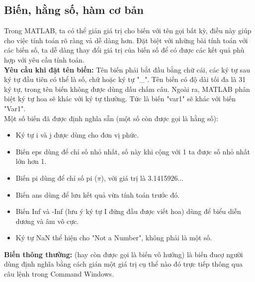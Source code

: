 \documentclass[12pt,a4paper]{article}
\begin{document}
\subsection{Biến, hằng số, hàm cơ bản}
Trong MATLAB, ta có thể gián giá trị cho biến với tên gọi bất kỳ, điều này giúp cho việc tính toán rõ ràng vả dễ dàng hơn. Đặt biệt với những bài tính toán với các biến số, ta dễ dàng thay đổi giá trị của biến số để có được các kết quả phù hợp với yêu cầu tính toán.\\
\textbf{Yêu cầu khi đặt tên biến:} Tên biến phải bắt đầu bằng chữ cái, các ký tự sau ký tự đầu tiên có thể là số, chữ hoặc ký tự "\_". Tên biến có độ dài tối đa là 31 ký tự, trong tên biến không được dùng dấu chấm câu. Ngoài ra, MATLAB phân biệt ký tự hoa sẽ khác với ký tự thường. Tức là biến "var1" sẽ khác với biến "Var1".\\
Một số biến đã được định nghĩa sẵn (một số còn được gọi là hằng số):
\begin{itemize}
	\item Ký tự i và j được dùng cho đơn vị phức.
	\item Biến eps dùng để chỉ số nhỏ nhất, số này khi cộng với 1 ta được số nhỏ nhất lớn hơn 1.
	\item Biến pi dùng để chỉ số pi ($\pi$), với giá trị là 3.1415926...
	\item Biến ans dùng để lưu kết quả vừa tính toán trước đó.
	\item Biến Inf và -Inf (lưu ý ký tự I đứng đầu được viết hoa) dùng để biểu diễn dương và âm vô cực.
	\item Ký tự NaN thể hiện cho "Not a Number", không phải là một số.
\end{itemize}
\textbf{Biến thông thường:} (hay còn được gọi là biến vô hướng) là biến đucợ người dùng định nghĩa bằng cách gián một giá trị cụ thể nào đó trực tiếp thông qua câu lệnh trong Command Windows.
\end{document}
